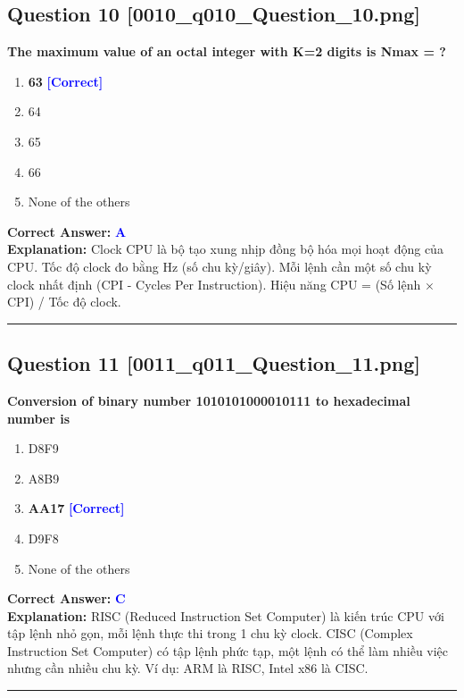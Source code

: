 \documentclass[11pt,a4paper]{article}
\begin{document}
\begin{minipage}{\textwidth}
\subsection*{Question 10 \quad \footnotesize{[0010\_q010\_Question\_10.png]}}
\noindent \textbf{The maximum value of an octal integer with K=2 digits is Nmax = ?}

\begin{enumerate}[label=\Alph*.]
    \item \textbf{63} \hfill \textcolor{blue}{\textbf{[Correct]}}
    \item 64
    \item 65
    \item 66
    \item None of the others
\end{enumerate}

\noindent \textbf{Correct Answer:} \textcolor{blue}{\textbf{A}} \\[2pt]
\noindent \textbf{Explanation:} Clock CPU là bộ tạo xung nhịp đồng bộ hóa mọi hoạt động của CPU. Tốc độ clock đo bằng Hz (số chu kỳ/giây). Mỗi lệnh cần một số chu kỳ clock nhất định (CPI - Cycles Per Instruction). Hiệu năng CPU = (Số lệnh × CPI) / Tốc độ clock.

\par\vspace{0.3cm}
\hrule
\vspace{0.3cm}
\end{minipage}

\begin{minipage}{\textwidth}
\subsection*{Question 11 \quad \footnotesize{[0011\_q011\_Question\_11.png]}}
\noindent \textbf{Conversion of binary number 1010101000010111 to hexadecimal number is}

\begin{enumerate}[label=\Alph*.]
    \item D8F9
    \item A8B9
    \item \textbf{AA17} \hfill \textcolor{blue}{\textbf{[Correct]}}
    \item D9F8
    \item None of the others
\end{enumerate}

\noindent \textbf{Correct Answer:} \textcolor{blue}{\textbf{C}} \\[2pt]
\noindent \textbf{Explanation:} RISC (Reduced Instruction Set Computer) là kiến trúc CPU với tập lệnh nhỏ gọn, mỗi lệnh thực thi trong 1 chu kỳ clock. CISC (Complex Instruction Set Computer) có tập lệnh phức tạp, một lệnh có thể làm nhiều việc nhưng cần nhiều chu kỳ. Ví dụ: ARM là RISC, Intel x86 là CISC.

\par\vspace{0.3cm}
\hrule
\vspace{0.3cm}
\end{minipage}
\end{document}
